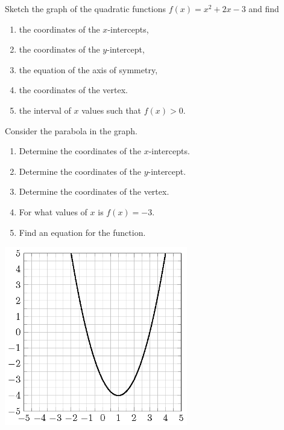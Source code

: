 \documentclass[en,12pt]{elegantbook}
\providecommand{\tightlist}{%
  \setlength{\itemsep}{0pt}\setlength{\parskip}{0pt}}
\providecommand{\tightlist}{%
  \setlength{\itemsep}{0pt}\setlength{\parskip}{0pt}}
\let\BeginKnitrBlock\begin \let\EndKnitrBlock\end
\begin{document}
\BeginKnitrBlock{exercise}
\protect\hypertarget{exr:unnamed-chunk-265}{}{\label{exr:unnamed-chunk-265} }
Sketch the graph of the quadratic functions \(f(x)=x^2+2x-3\) and find

\begin{enumerate}
\def\labelenumi{\arabic{enumi}.}
\tightlist
\item
  the coordinates of the \(x\)-intercepts,
\item
  the coordinates of the \(y\)-intercept,
\item
  the equation of the axis of symmetry,
\item
  the coordinates of the vertex.
\item
  the interval of \(x\) values such that \(f(x)>0\).
\end{enumerate}
\EndKnitrBlock{exercise}

\BeginKnitrBlock{exercise}
\protect\hypertarget{exr:unnamed-chunk-266}{}{\label{exr:unnamed-chunk-266} }
Consider the parabola in the graph.

\begin{enumerate}
\def\labelenumi{\arabic{enumi}.}
\tightlist
\item
  Determine the coordinates of the \(x\)-intercepts.
\item
  Determine the coordinates of the \(y\)-intercept.
\item
  Determine the coordinates of the vertex.
\item
  For what values of \(x\) is \(f(x)=-3\).
\item
  Find an equation for the function.
\end{enumerate}

\includegraphics[width=0.6\textwidth,height=\textheight]{figs/tikz-exercise-graph-quadratic-1.png}\\
\EndKnitrBlock{exercise}
\end{document}
